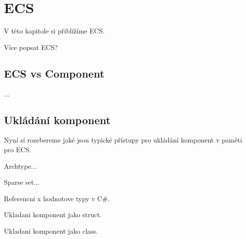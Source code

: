\chapter{ECS}
V této kapitole si přiblížíme ECS.

Více popsat ECS?

\section{ECS vs Component}
...

\section{Ukládání komponent}
Nyní si rozebereme jaké jsou typické přístupy pro ukládání komponent v paměti pro ECS.

Archtype...

Sparse set...

Referencni x hodnotove typy v C\#.

Ukladani komponent jako struct.

Ukladani komponent jako class.




